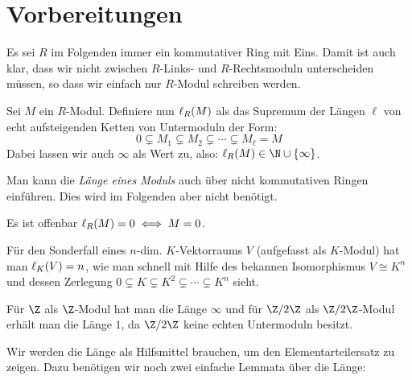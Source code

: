 
\chapter{Vorbereitungen}
Es sei $R$ im Folgenden immer ein kommutativer Ring mit Eins. Damit ist auch klar, dass
wir nicht zwischen $R$-Links- und $R$-Rechtsmoduln unterscheiden müssen, so dass
wir einfach nur $R$-Modul schreiben werden.

\begin{thDef}
    Sei $M$ ein $R$-Modul. Definiere nun $\len(M)$ als das Supremum der Längen
    $\ell$ von echt aufsteigenden Ketten von Untermoduln der Form:
    \[ 0 \subsetneq M_1 \subsetneq M_2 \subsetneq \cdots \subsetneq M_\ell = M \]
    Dabei lassen wir auch $\infty$ als Wert zu, also: $\len(M) \in
    \N\cup\{\infty\}$.
\end{thDef}

\begin{thBemerkung}
    Man kann die \emph{Länge eines Moduls} auch über nicht kommutativen Ringen
    einführen. Dies wird im Folgenden aber nicht benötigt.
\end{thBemerkung}

\begin{BspList}
\item
    Es ist offenbar $\len(M) = 0 \iff M = 0$.
\item
    Für den Sonderfall eines $n$-dim. $K$-Vektorraums $V$ (aufgefasst als
    $K$-Modul) hat man $\len[K](V) = n$, wie man schnell mit Hilfe des bekannen
    Isomorphismus $V \cong K^n$ und dessen Zerlegung $0\subsetneq K \subsetneq
    K^2 \subsetneq \cdots \subsetneq K^n$ sieht.
\item
    Für $\Z$ als $\Z$-Modul hat man die Länge $\infty$ und für $\ZRest2$ als
    $\ZRest2$-Modul erhält man die Länge $1$, da $\ZRest2$ keine echten
    Untermoduln besitzt.
\end{BspList}

Wir werden die Länge als Hilfsmittel brauchen, um den Elementarteilersatz
 zu zeigen. Dazu benötigen wir noch zwei einfache Lemmata über die
Länge:

